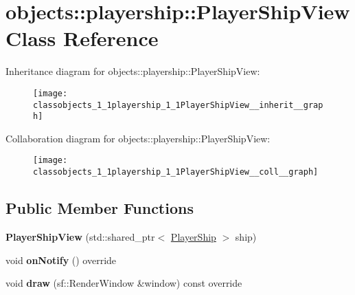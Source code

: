 \hypertarget{classobjects_1_1playership_1_1PlayerShipView}{}\section{objects\+:\+:playership\+:\+:Player\+Ship\+View Class Reference}
\label{classobjects_1_1playership_1_1PlayerShipView}


Inheritance diagram for objects\+:\+:playership\+:\+:Player\+Ship\+View\+:\nopagebreak
\begin{figure}[H]
\begin{center}
\leavevmode
\texttt{[image: classobjects\_1\_1playership\_1\_1PlayerShipView\_\_inherit\_\_graph]}
\end{center}
\end{figure}


Collaboration diagram for objects\+:\+:playership\+:\+:Player\+Ship\+View\+:\nopagebreak
\begin{figure}[H]
\begin{center}
\leavevmode
\texttt{[image: classobjects\_1\_1playership\_1\_1PlayerShipView\_\_coll\_\_graph]}
\end{center}
\end{figure}
\subsection*{Public Member Functions}
\begin{DoxyCompactItemize}
\item 
\mbox{\label{classobjects_1_1playership_1_1PlayerShipView_a9f863260d81efc4cdfb213af754b5732}}
{\bfseries Player\+Ship\+View} (std\+::shared\+\_\+ptr$<$ \hyperlink{classobjects_1_1playership_1_1PlayerShip}{Player\+Ship} $>$ ship)
\item 
\mbox{\label{classobjects_1_1playership_1_1PlayerShipView_a141c615a79dabf823243993f699cb039}}
void {\bfseries on\+Notify} () override
\item 
\mbox{\label{classobjects_1_1playership_1_1PlayerShipView_abce403c13058a9d56d8a668c4da659af}}
void {\bfseries draw} (sf\+::\+Render\+Window \&window) const override
\end{DoxyCompactItemize}
